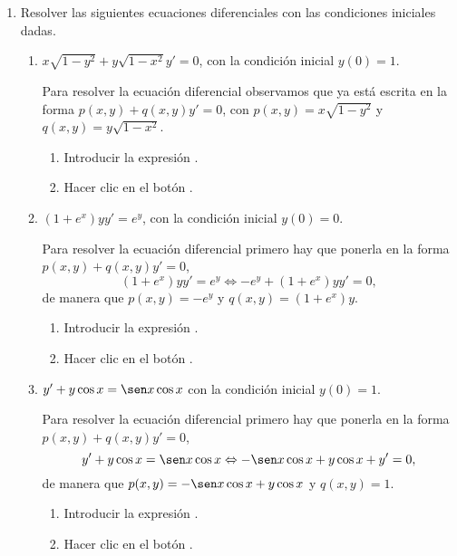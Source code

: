 \begin{enumerate}[leftmargin=*]
\item Resolver las siguientes ecuaciones diferenciales con las condiciones iniciales dadas.
\begin{enumerate}
\item $x\sqrt{1-y^2}+y\sqrt{1-x^2} y'=0$, con la condición inicial $y(0)=1$.
\begin{indication}
Para resolver la ecuación diferencial observamos que ya está escrita en la forma $p(x,y)+q(x,y)y'=0$, con
$p(x,y)=x\sqrt{1-y^2}$ y $q(x,y)=y\sqrt{1-x^2}$.
\begin{enumerate}
\item Introducir la expresión .
\item Hacer clic en el botón .
\end{enumerate}
\end{indication}


\item $(1+e^x)yy'=e^y$, con la condición inicial $y(0)=0$.
\begin{indication}
Para resolver la ecuación diferencial primero hay que ponerla en la forma $p(x,y)+q(x,y)y'=0$,
\[
(1+e^x)yy'=e^y \Leftrightarrow -e^y+(1+e^x)yy'=0,
\]
de manera que $p(x,y)=-e^y$ y $q(x,y)=(1+e^x)y$.
\begin{enumerate}
\item Introducir la expresión .
\item Hacer clic en el botón .
\end{enumerate}
\end{indication}


\item $y'+y\cos x=\sen x\cos x$ con la condición inicial $y(0)=1$.
\begin{indication}
Para resolver la ecuación diferencial primero hay que ponerla en la forma $p(x,y)+q(x,y)y'=0$,
\[
y'+y\cos x=\sen x\cos x \Leftrightarrow -\sen x\cos x+y\cos x+y'=0,
\]
de manera que $p(x,y)=-\sen x\cos x+y\cos x$ y $q(x,y)=1$.
\begin{enumerate}
\item Introducir la expresión .
\item Hacer clic en el botón .
\end{enumerate}
\end{indication}
\end{enumerate}


\end{enumerate}
